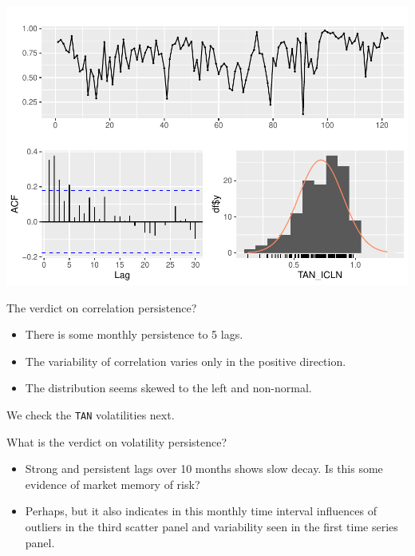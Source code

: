 \documentclass{article}
\newenvironment{Shaded}{\begin{snugshade}}{\end{snugshade}}
\newcommand{\AttributeTok}[1]{\textcolor[rgb]{0.77,0.63,0.00}{#1}}
\newcommand{\DecValTok}[1]{\textcolor[rgb]{0.00,0.00,0.81}{#1}}
\newcommand{\FunctionTok}[1]{\textcolor[rgb]{0.00,0.00,0.00}{#1}}
\newcommand{\NormalTok}[1]{#1}
\newcommand{\OtherTok}[1]{\textcolor[rgb]{0.56,0.35,0.01}{#1}}
\newcommand{\SpecialCharTok}[1]{\textcolor[rgb]{0.00,0.00,0.00}{#1}}
\newcommand{\StringTok}[1]{\textcolor[rgb]{0.31,0.60,0.02}{#1}}
\begin{document}
\includegraphics{market-facts_files/figure-latex/persistcorr-1.pdf}

The verdict on correlation persistence?

\begin{itemize}
\item
  There is some monthly persistence to 5 lags.
\item
  The variability of correlation varies only in the positive direction.
\item
  The distribution seems skewed to the left and non-normal.
\end{itemize}

We check the \texttt{TAN} volatilities next.

\begin{Shaded}
\end{Shaded}

What is the verdict on volatility persistence?

\begin{itemize}
\item
  Strong and persistent lags over 10 months shows slow decay. Is this
  some evidence of market memory of risk?
\item
  Perhaps, but it also indicates in this monthly time interval
  influences of outliers in the third scatter panel and variability seen
  in the first time series panel.
\end{itemize}
\end{document}
